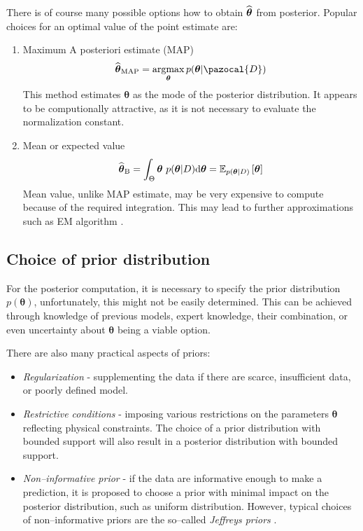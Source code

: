 There is of course many possible options how to obtain $\widehat{\boldsymbol{\theta}}$ from posterior. Popular choices for an optimal value of the point estimate are:
\begin{enumerate}
	\item Maximum A posteriori estimate (MAP)
	\begin{equation}
		\widehat{\boldsymbol{\theta}}_{\mathrm{MAP}} = \argmax_{\boldsymbol{\theta}} p(\boldsymbol{\theta} | \pazocal{D})
	\end{equation}
This method estimates $\boldsymbol{\theta}$ as the mode of the posterior distribution. It appears to be computionally attractive, as it is not necessary to evaluate the normalization constant. 
\item Mean or expected value
\begin{equation}
	\widehat{\boldsymbol{\theta}}_{\mathrm{B}} = \int_{\Theta} \boldsymbol{\theta}~ p(\boldsymbol{\theta} | D) \mathrm{d}\boldsymbol{\theta} = \mathbb{E}_{p(\boldsymbol{\theta} | D) }\left[\boldsymbol{\theta} \right]
\end{equation}
Mean value, unlike MAP estimate, may be very expensive to compute because of the required integration. This may lead to further approximations such as EM algorithm \cite{EM}.
\end{enumerate}	

\subsection{Choice of prior distribution}
For the posterior computation, it is necessary to specify the prior distribution $p(\boldsymbol{\theta})$, unfortunately, this might not be easily determined. This can be achieved through knowledge of previous models, expert knowledge, their combination, or even uncertainty about $\boldsymbol{\theta}$ being a viable option. 

There are also many practical aspects of priors:
\begin{itemize}
	\item \emph{Regularization} - supplementing the data if there are scarce, insufficient data, or poorly defined model. 
	\item \emph{Restrictive conditions} - imposing various restrictions on the parameters $\boldsymbol{\theta}$ reflecting physical constraints. The choice of a prior distribution with bounded support will also result in a posterior distribution with bounded support. 
	\item \emph{Non--informative prior} - if the data are informative enough to make a prediction, it is proposed to choose a prior with minimal impact on the posterior distribution, such as uniform distribution. However, typical choices of non--informative priors are the so--called \emph{Jeffreys priors} \cite{jeffrey}.
\end{itemize}



